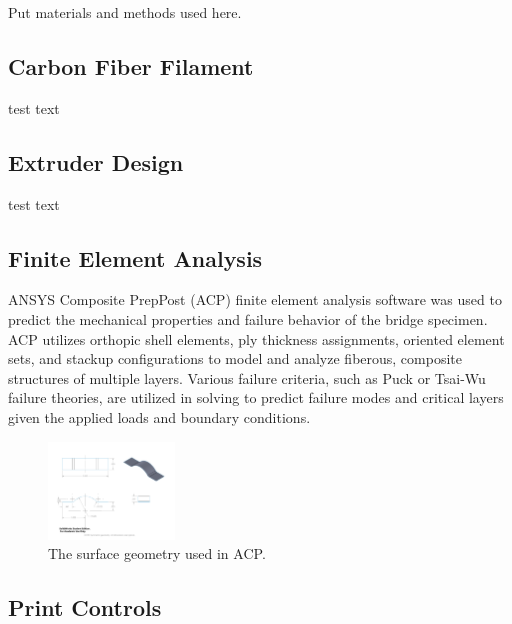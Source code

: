 

Put materials and methods used here.

\subsection*{Carbon Fiber Filament}

test text\\

\subsection*{Extruder Design}

test text\\

\subsection*{Finite Element Analysis}

ANSYS Composite PrepPost (ACP) finite element analysis software was used to predict the mechanical properties and failure behavior of the bridge specimen. ACP utilizes orthopic shell elements, ply thickness assignments, oriented element sets, and stackup configurations to model and analyze fiberous, composite structures of multiple layers. Various failure criteria, such as Puck or Tsai-Wu failure theories, are utilized in solving to predict failure modes and critical layers given the applied loads and boundary conditions.

\begin{figure}[htp]
\includegraphics[width=0.3\textwidth]{./figures/fea/fea-surface-geometry}
\caption{The surface geometry used in ACP.}
\label{fig:fea-bridge-speciment}
\end{figure}


\subsection*{Print Controls}


